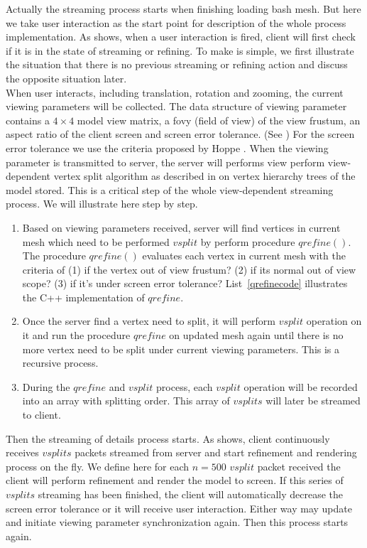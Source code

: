 Actually the streaming process starts when finishing loading bash mesh. But here we take user interaction as the start point for description of the whole process implementation. As  shows, when a user interaction is fired, client will first check if it is in the state of streaming or refining. To make is simple, we first illustrate the situation that there is no previous streaming or refining action and discuss the opposite situation later.\\

When user interacts, including translation, rotation and zooming, the current viewing parameters will be collected. The data structure of viewing parameter contains a $4 \times 4$ model view matrix, a fovy (field of view) of the view frustum, an aspect ratio of the client screen and screen error tolerance. (See ) For the screen error tolerance we use the criteria proposed by Hoppe \cite{Hoppe:1997:VRP}. When the viewing parameter is transmitted to server, the server will performs view perform view-dependent vertex split algorithm as described in  on vertex hierarchy trees of the model stored. This is a critical step of the whole view-dependent streaming process. We will illustrate here step by step. 
\begin{enumerate}
\item
Based on viewing parameters received, server will find vertices in current mesh which need to be performed $vsplit$ by perform procedure $qrefine()$. The procedure $qrefine()$ evaluates each vertex in current mesh with the criteria of (1) if the vertex out of view frustum? (2) if its normal out of view scope? (3) if it's under screen error tolerance? List~\ref{qrefinecode} illustrates the C++ implementation of $qrefine$. 
\item
Once the server find a vertex need to split, it will perform $vsplit$ operation on it and run the procedure $qrefine$ on updated mesh again until there is no more vertex need to be split under current viewing parameters. This is a recursive process. 
\item
During the $qrefine$ and $vsplit$ process, each $vsplit$ operation will be recorded into an array with splitting order. This array of $vsplits$ will later be streamed to client. 
\end{enumerate}


Then the streaming of details process starts. As  shows, client continuously receives $vsplits$ packets streamed from server and start refinement and rendering process on the fly. We define here for each $n=500$ $vsplit$ packet received the client will perform refinement and render the model to screen. If this series of $vsplits$ streaming has been finished, the client will automatically decrease the screen error tolerance or it will receive user interaction. Either way may update  and initiate viewing parameter synchronization again. Then this process starts again.\\

